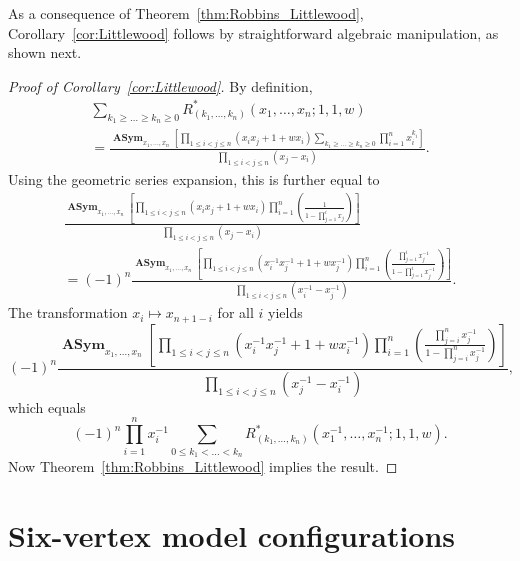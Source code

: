 \documentclass[ALCO, Unicode]{cedram}
\DeclareMathOperator{\asym}{\mathbf{ASym}}
\begin{document}
	
	As a consequence of Theorem~\ref{thm:Robbins_Littlewood}, Corollary~\ref{cor:Littlewood} follows by straightforward algebraic manipulation, as shown next.
	
	\begin{proof}[Proof of Corollary~\ref{cor:Littlewood}] By definition, 
		\begin{multline*}
			\sum_{k_1 \ge \dots \ge k_n \ge 0} R^{\ast}_{(k_{1},\ldots,k_{n})}(x_{1},\ldots,x_{n};1,1,w) \\ 
			= \frac{
				\asym_{x_1,\ldots,x_n} \left[ \prod_{1 \le i < j \le n} (x_i x_j +1 + w x_i) \sum_{k_1 \ge \dots \ge k_n \ge 0 } \prod_{i=1}^n x_i^{k_i} \right]}
			{\prod_{1 \le i < j \le n} (x_j - x_i)}.
		\end{multline*} 
		Using the geometric series expansion, this is further equal to
		\begin{multline*} 
			\frac{
				\asym_{x_1,\ldots,x_n} \left[ \prod_{1 \le i < j \le n} (x_i x_j +1 + w x_i) 
				\prod_{i=1}^{n} \left( \frac{1}{1 - \prod_{j=1}^i x_j} \right) \right]}
			{\prod_{1 \le i < j \le n} (x_j - x_i)} \\
			= (-1)^n \frac{\asym_{x_1,\ldots,x_n} \left[ \prod_{1 \le i < j \le n} (x_i^{-1} x_j^{-1} +1 + w x_j^{-1}) 
				\prod_{i=1}^{n} \left( \frac{\prod_{j=1}^i x_j^{-1}}{1 - \prod_{j=1}^i x_j^{-1}} \right) \right]}
			{\prod_{1 \le i < j \le n} (x_i^{-1} - x_j^{-1})}.
		\end{multline*} 
		The transformation $x_i \mapsto x_{n+1-i}$ for all $i$ yields
		\begin{equation*}
			(-1)^n \frac{\asym_{x_1,\ldots,x_n} \left[ \prod_{1 \le i < j \le n} (x_i^{-1} x_j^{-1} +1 + w x_i^{-1}) 
				\prod_{i=1}^{n} \left( \frac{ \prod_{j=i}^n x_j^{-1}}{1 - \prod_{j=i}^n x_j^{-1}} \right) \right]}
			{\prod_{1 \le i < j \le n} (x_j^{-1} - x_i^{-1})},
		\end{equation*}
		which equals
		\begin{equation*}
			(-1)^n \prod_{i=1}^n x_i^{-1} \sum_{0 \le k_1 < \dots < k_n} R^{\ast}_{(k_{1},\ldots,k_{n})}(x_{1}^{-1},\ldots,x_{n}^{-1};1,1,w).
		\end{equation*}
		Now Theorem~\ref{thm:Robbins_Littlewood} implies the result. 
	\end{proof}
	
	
	
	\section{Six-vertex model configurations}
	\label{sec:six-vertex}
	
\end{document}
